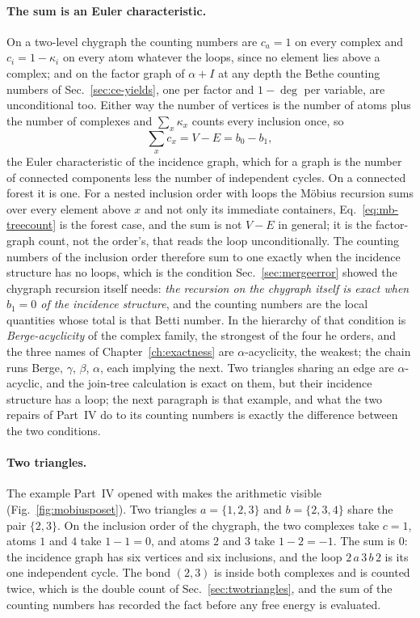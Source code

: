 \paragraph{The sum is an Euler characteristic.} On a two-level chygraph
the counting numbers are $c_{a}=1$ on every complex and $c_{i}=1-\kappa_{i}$
on every atom whatever the loops, since no element lies above a complex;
and on the factor graph of $\alpha+I$ at any depth the Bethe counting
numbers of Sec.~\ref{sec:ce-yields}, one per factor and $1-\deg$ per
variable, are unconditional too. Either way the number of vertices is the
number of atoms plus the number of complexes and $\sum_{x}\kappa_{x}$
counts every inclusion once, so
\begin{equation}
  \sum_{x}c_{x}=V-E=b_{0}-b_{1},
  \label{eq:mb-euler}
\end{equation}
the Euler characteristic of the incidence graph, which for a graph is the
number of connected components less the number of independent cycles. On a
connected forest it is one. For a nested inclusion order with loops the
M\"obius recursion sums over every element above $x$ and not only its
immediate containers, Eq.~\eqref{eq:mb-treecount} is the forest case, and
the sum is not $V-E$ in general; it is the factor-graph count, not the
order's, that reads the loop unconditionally. The counting numbers of the inclusion order
therefore sum to one exactly when the incidence structure has no loops,
which is the condition Sec.~\ref{sec:mergeerror} showed the chygraph
recursion itself needs: \emph{the recursion on the chygraph itself is
exact when $b_{1}=0$ of the incidence structure}, and the counting numbers
are the local quantities whose total is that Betti number. In the
hierarchy of \citet{fagin1983} that condition is \emph{Berge-acyclicity}
of the complex family, the strongest of the four he orders, and the three
names of Chapter~\ref{ch:exactness} are $\alpha$-acyclicity, the weakest;
the chain runs Berge, $\gamma$, $\beta$, $\alpha$, each implying the
next. Two triangles sharing an edge are $\alpha$-acyclic, and the
join-tree calculation is exact on them, but their incidence structure has
a loop; the next paragraph is that example, and what the two repairs of
Part~IV do to its counting numbers is exactly the difference between the
two conditions.

\paragraph{Two triangles.} The example Part~IV opened with makes the
arithmetic visible (Fig.~\ref{fig:mobiusposet}). Two triangles $a=\{1,2,3\}$
and $b=\{2,3,4\}$ share the pair $\{2,3\}$. On the inclusion order of the
chygraph, the two complexes take $c=1$, atoms $1$ and $4$ take
$1-1=0$, and atoms $2$ and $3$ take $1-2=-1$. The sum is $0$: the incidence
graph has six vertices and six inclusions, and the loop $2\,a\,3\,b\,2$ is its
one independent cycle. The bond $(2,3)$ is inside both complexes and is
counted twice, which is the double count of Sec.~\ref{sec:twotriangles}, and
the sum of the counting numbers has recorded the fact before any free energy
is evaluated.

